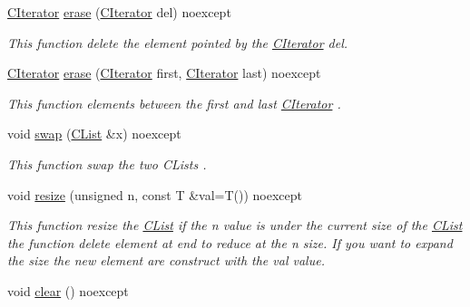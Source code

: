 \begin{DoxyCompactItemize}
\item 
\hyperlink{structnsSdD_1_1CList_1_1CIterator}{C\+Iterator} \hyperlink{classnsSdD_1_1CList_afe12f69415482120c58b59ae7baaa434}{erase} (\hyperlink{structnsSdD_1_1CList_1_1CIterator}{C\+Iterator} del) noexcept
\begin{DoxyCompactList}\small\item\em This function delete the element pointed by the \hyperlink{structnsSdD_1_1CList_1_1CIterator}{C\+Iterator} {\ttfamily del}. \end{DoxyCompactList}\item 
\hyperlink{structnsSdD_1_1CList_1_1CIterator}{C\+Iterator} \hyperlink{classnsSdD_1_1CList_a11cda22711d403a4ae5dbb4a921a03d4}{erase} (\hyperlink{structnsSdD_1_1CList_1_1CIterator}{C\+Iterator} first, \hyperlink{structnsSdD_1_1CList_1_1CIterator}{C\+Iterator} last) noexcept
\begin{DoxyCompactList}\small\item\em This function elements between the {\ttfamily first} and {\ttfamily last} \hyperlink{structnsSdD_1_1CList_1_1CIterator}{C\+Iterator} . \end{DoxyCompactList}\item 
void \hyperlink{classnsSdD_1_1CList_ac59d9d1e5bbbe59c5cc549800fd2e49a}{swap} (\hyperlink{classnsSdD_1_1CList}{C\+List} \&x) noexcept
\begin{DoxyCompactList}\small\item\em This function swap the two C\+Lists . \end{DoxyCompactList}\item 
void \hyperlink{classnsSdD_1_1CList_a4e9ff3339d35afb16b7f698c9c7f4fbf}{resize} (unsigned n, const T \&val=T()) noexcept
\begin{DoxyCompactList}\small\item\em This function resize the \hyperlink{classnsSdD_1_1CList}{C\+List} if the {\ttfamily n} value is under the current size of the \hyperlink{classnsSdD_1_1CList}{C\+List} the function delete element at end to reduce at the {\ttfamily n} size. If you want to expand the size the new element are construct with the {\ttfamily val} value. \end{DoxyCompactList}\item 
\hypertarget{classnsSdD_1_1CList_abc30f88bfb8854dff3fa4544e4bf5450}{void \hyperlink{classnsSdD_1_1CList_abc30f88bfb8854dff3fa4544e4bf5450}{clear} () noexcept}\label{classnsSdD_1_1CList_abc30f88bfb8854dff3fa4544e4bf5450}


\end{DoxyCompactItemize}
